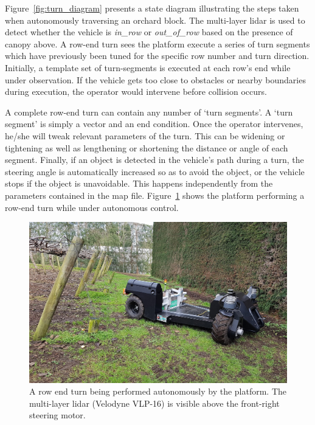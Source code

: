 \documentclass[preprint,authoryear,12pt]{elsarticle}
\begin{document}
    Figure~\ref{fig:turn_diagram} presents a state diagram illustrating the steps taken when autonomously traversing an orchard block.
    The multi-layer lidar is used to detect whether the vehicle is \textit{in\_row} or \textit{out\_of\_row} based on the presence of canopy above.
    A row-end turn sees the platform execute a series of turn segments which have previously been tuned for the specific row number and turn direction.
    Initially, a template set of turn-segments is executed at each row's end while under observation.
    If the vehicle gets too close to obstacles or nearby boundaries during execution, the operator would intervene before collision occurs.

    A complete row-end turn can contain any number of `turn segments'.
    A `turn segment' is simply a vector and an end condition.
    Once the operator intervenes, he/she will tweak relevant parameters of the turn.
    This can be widening or tightening as well as lengthening or shortening the distance or angle of each segment.
    Finally, if an object is detected in the vehicle's path during a turn, the steering angle is automatically increased so as to avoid the object, or the vehicle stops if the object is unavoidable.
    This happens independently from the parameters contained in the map file.
    Figure~\ref{fig:suzy_turning} shows the platform performing a row-end turn while under autonomous control.

    \begin{figure}[htb]
        \centering
        \includegraphics[width=\linewidth]{imgs/photos/suzy_turning.jpg}
        \caption{
            A row end turn being performed autonomously by the platform.
            The multi-layer lidar (Velodyne VLP-16) is visible above the front-right steering motor.
        }
        \label{fig:suzy_turning}
    \end{figure}
\end{document}
